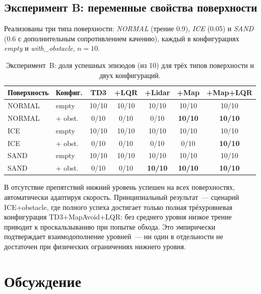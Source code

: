 \documentclass[11pt]{article}
\begin{document}
\subsection{Эксперимент B: переменные свойства поверхности}
\label{sec:exp_b}

Реализованы три типа поверхности: \emph{NORMAL} (трение 0.9), \emph{ICE} (0.05) и \emph{SAND} (0.6 с дополнительным сопротивлением качению), каждый в конфигурациях \emph{empty} и \emph{with\_obstacle}, $n = 10$.

\begin{table}[h]
\begin{center}
\begin{tabular}{llccccc}
\toprule
Поверхность & Конфиг. & TD3 & +LQR & +Lidar & +Map & +Map+LQR \\
\midrule
NORMAL & empty     & 10/10 & 10/10 & 10/10 & 10/10 & 10/10 \\
NORMAL & + obst.   & 0/10  & 0/10  & 0/10  & \textbf{10/10} & \textbf{10/10} \\
ICE    & empty     & 10/10 & 10/10 & 10/10 & 10/10 & 10/10 \\
ICE    & + obst.   & 0/10  & 0/10  & 0/10  & 0/10  & \textbf{10/10} \\
SAND   & empty     & 10/10 & 10/10 & 10/10 & 10/10 & 10/10 \\
SAND   & + obst.   & 0/10  & 0/10  & \textbf{10/10}  & \textbf{10/10} & \textbf{10/10} \\
\bottomrule
\end{tabular}
\caption{Эксперимент~B: доля успешных эпизодов (из 10) для трёх типов поверхности и двух конфигураций.}
\label{tab:exp_b}
\end{center}
\end{table}

В отсутствие препятствий нижний уровень успешен на всех поверхностях, автоматически адаптируя скорость. Принципиальный результат~--- сценарий ICE+obstacle, где полного успеха достигает только полная трёхуровневая конфигурация TD3+MapAvoid+LQR: без среднего уровня низкое трение приводит к проскальзыванию при попытке обхода. Это эмпирически подтверждает взаимодополнение уровней~--- ни один в отдельности не достаточен при физических ограничениях нижнего уровня.

\section{Обсуждение}
\label{sec:discussion}
\end{document}
